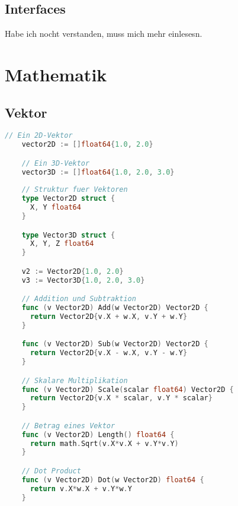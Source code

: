 \documentclass[twoside,a4paper,12pt]{article}
\begin{document}
\subsection{Interfaces}
Habe ich nocht verstanden, muss mich mehr einlesesn.

\section{Mathematik}
\subsection{Vektor}
\begin{center}
  \begin{minipage}{1.0\textwidth}
   \begin{lstlisting}[language=Go]
    // Ein 2D-Vektor
    vector2D := []float64{1.0, 2.0}

    // Ein 3D-Vektor
    vector3D := []float64{1.0, 2.0, 3.0}
   
    // Struktur fuer Vektoren
    type Vector2D struct {
      X, Y float64
    }

    type Vector3D struct {
      X, Y, Z float64
    }

    v2 := Vector2D{1.0, 2.0}
    v3 := Vector3D{1.0, 2.0, 3.0}

    // Addition und Subtraktion
    func (v Vector2D) Add(w Vector2D) Vector2D {
      return Vector2D{v.X + w.X, v.Y + w.Y}
    }

    func (v Vector2D) Sub(w Vector2D) Vector2D {
      return Vector2D{v.X - w.X, v.Y - w.Y}
    }

    // Skalare Multiplikation
    func (v Vector2D) Scale(scalar float64) Vector2D {
      return Vector2D{v.X * scalar, v.Y * scalar}
    }

    // Betrag eines Vektor
    func (v Vector2D) Length() float64 {
      return math.Sqrt(v.X*v.X + v.Y*v.Y)
    }

    // Dot Product
    func (v Vector2D) Dot(w Vector2D) float64 {
      return v.X*w.X + v.Y*w.Y
    }
   \end{lstlisting} 
  \end{minipage}
  
\end{center}
\end{document}
